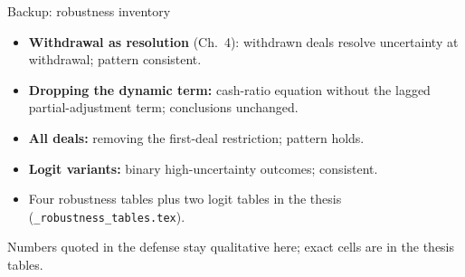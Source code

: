 \documentclass[aspectratio=169, 11pt]{beamer}
\begin{document}
\begin{frame}[noframenumbering]{Backup: robustness inventory}
  \begin{itemize}
    \item \textbf{Withdrawal as resolution} (Ch.\ 4): withdrawn deals resolve
      uncertainty at withdrawal; pattern consistent.
    \item \textbf{Dropping the dynamic term:} cash-ratio equation without the
      lagged partial-adjustment term; conclusions unchanged.
    \item \textbf{All deals:} removing the first-deal restriction; pattern holds.
    \item \textbf{Logit variants:} binary high-uncertainty outcomes; consistent.
    \item Four robustness tables plus two logit tables in the thesis
      (\texttt{\_robustness\_tables.tex}).
  \end{itemize}
  \vspace{0.5em}
  {\small\color{mutedgray} Numbers quoted in the defense stay qualitative here;
  exact cells are in the thesis tables.}
\end{frame}
\end{document}
